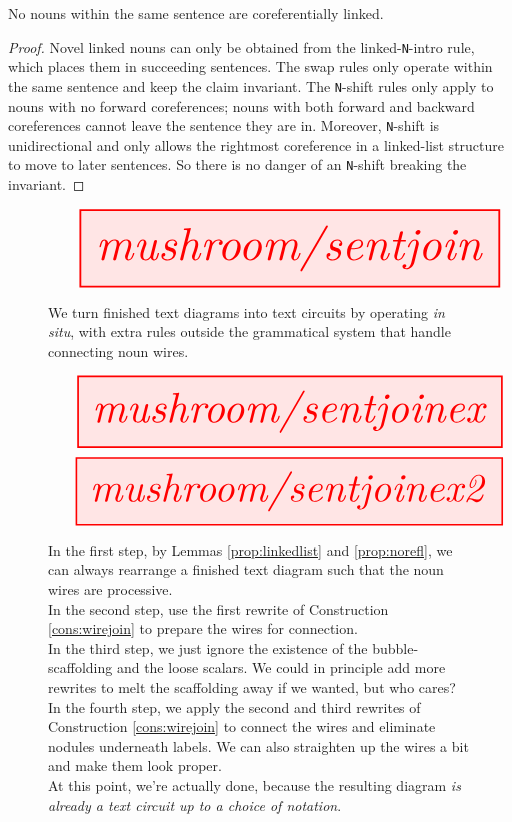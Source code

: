 \begin{lemma}\label{prop:norefl}
No nouns within the same sentence are coreferentially linked.
\begin{proof}
Novel linked nouns can only be obtained from the linked-\texttt{N}-intro rule, which places them in succeeding sentences. The swap rules only operate within the same sentence and keep the claim invariant. The \texttt{N}-shift rules only apply to nouns with no forward coreferences; nouns with both forward and backward coreferences cannot leave the sentence they are in. Moreover, \texttt{N}-shift is unidirectional and only allows the rightmost coreference in a linked-list structure to move to later sentences. So there is no danger of an \texttt{N}-shift breaking the invariant.
\end{proof}
\end{lemma}

\newpage

\begin{construction}\label{cons:wirejoin}
\begin{figure}[h!]
\centering
\[
\resizebox{\textwidth}{!}{\tikzfig{mushroom/sentjoin}} 
\]
\caption{We turn finished text diagrams into text circuits by operating \emph{in situ}, with extra rules outside the grammatical system that handle connecting noun wires.
}
\end{figure}
\end{construction}

\begin{figure}[h!]
\centering
\[
\resizebox{\textwidth}{!}{\tikzfig{mushroom/sentjoinex}} 
\]
\[
\resizebox{\textwidth}{!}{\tikzfig{mushroom/sentjoinex2}} 
\]
\caption{
In the first step, by Lemmas \ref{prop:linkedlist} and \ref{prop:norefl}, we can always rearrange a finished text diagram such that the noun wires are processive.\\

In the second step, use the first rewrite of Construction \ref{cons:wirejoin} to prepare the wires for connection.\\

In the third step, we just ignore the existence of the bubble-scaffolding and the loose scalars. We could in principle add more rewrites to melt the scaffolding away if we wanted, but who cares?\\

In the fourth step, we apply the second and third rewrites of Construction \ref{cons:wirejoin} to connect the wires and eliminate nodules underneath labels. We can also straighten up the wires a bit and make them look proper.\\

At this point, we're actually done, because the resulting diagram \emph{is already a text circuit up to a choice of notation}.
}
\end{figure}

